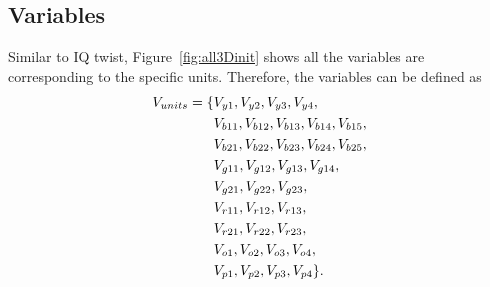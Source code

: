 \subsection{Variables}
Similar to IQ twist, Figure~\ref{fig:all3Dinit} shows all the variables are corresponding to the specific units. Therefore, the variables can be defined as
\begin{equation}
\begin{aligned}
V_{units}=\{&V_{y1},V_{y2},V_{y3},V_{y4},\\&V_{b11},V_{b12},V_{b13},V_{b14},
V_{b15},\\&V_{b21},V_{b22},V_{b23},V_{b24},V_{b25},\\&V_{g11},V_{g12},V_{g13},V_{g14},\\&V_{g21},V_{g22},V_{g23},\\&V_{r11},
V_{r12},V_{r13},\\&V_{r21},V_{r22},V_{r23},\\&V_{o1},V_{o2},V_{o3},V_{o4},\\&V_{p1},V_{p2},V_{p3},V_{p4}\}.
\end{aligned}
\end{equation}
